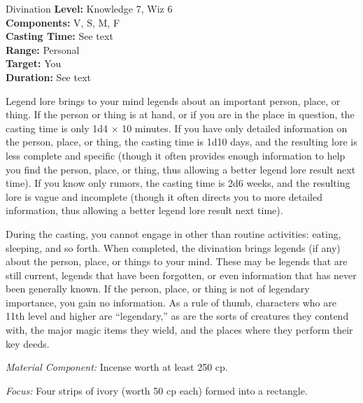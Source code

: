{Divination}
{
	\textbf{Level:}
	Knowledge 7, Wiz 6\\
	\textbf{Components:}
	V, S, M, F\\
	\textbf{Casting Time:}
	See text\\
	\textbf{Range:}
	Personal\\
	\textbf{Target:}
	You\\
	\textbf{Duration:}
	See text\\
}
{
	Legend lore brings to your mind legends about an important person, place, or thing. If the person or thing is at hand, or if you are in the place in question, the casting time is only 1d4 $\times$ 10 minutes. If you have only detailed information on the person, place, or thing, the casting time is 1d10 days, and the resulting lore is less complete and specific (though it often provides enough information to help you find the person, place, or thing, thus allowing a better legend lore result next time). If you know only rumors, the casting time is 2d6 weeks, and the resulting lore is vague and incomplete (though it often directs you to more detailed information, thus allowing a better legend lore result next time).

	During the casting, you cannot engage in other than routine activities: eating, sleeping, and so forth. When completed, the divination brings legends (if any) about the person, place, or things to your mind. These may be legends that are still current, legends that have been forgotten, or even information that has never been generally known. If the person, place, or thing is not of legendary importance, you gain no information. As a rule of thumb, characters who are 11th level and higher are ``legendary,'' as are the sorts of creatures they contend with, the major magic items they wield, and the places where they perform their key deeds.

	\textit{Material Component:}
	Incense worth at least 250 cp.

	\textit{Focus:}
	Four strips of ivory (worth 50 cp each) formed into a rectangle.

}
